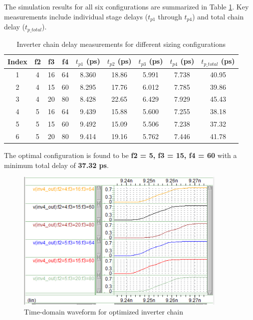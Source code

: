 \documentclass[UTF8,12pt,a4paper]{ctexart}
\begin{document}
The simulation results for all six configurations are summarized in Table \ref{tab:task2_results}. Key measurements include individual stage delays ($t_{p1}$ through $t_{p4}$) and total chain delay ($t_{p\_total}$).

\begin{table}[h]
\centering
\small
\begin{tabular}{|c|c|c|c|c|c|c|c|c|}
\hline
\textbf{Index} & \textbf{f2} & \textbf{f3} & \textbf{f4} & \textbf{$t_{p1}$ (ps)} & \textbf{$t_{p2}$ (ps)} & \textbf{$t_{p3}$ (ps)} & \textbf{$t_{p4}$ (ps)} & \textbf{$t_{p\_total}$ (ps)} \\
\hline
1 & 4 & 16 & 64 & 8.360 & 18.86 & 5.991 & 7.738 & 40.95 \\
2 & 4 & 15 & 60 & 8.295 & 17.76 & 6.012 & 7.785 & 39.86 \\
3 & 4 & 20 & 80 & 8.428 & 22.65 & 6.429 & 7.929 & 45.43 \\
4 & 5 & 16 & 64 & 9.439 & 15.88 & 5.600 & 7.255 & 38.18 \\
5 & 5 & 15 & 60 & 9.492 & 15.09 & 5.506 & 7.238 & 37.32 \\
6 & 5 & 20 & 80 & 9.414 & 19.16 & 5.762 & 7.446 & 41.78 \\
\hline
\end{tabular}
\caption{Inverter chain delay measurements for different sizing configurations}
\label{tab:task2_results}
\end{table}

The optimal configuration is found to be \textbf{f2 = 5, f3 = 15, f4 = 60} with a minimum total delay of \textbf{37.32 ps}.

\begin{figure}[h]
\centering
\includegraphics[width=0.9\textwidth]{任务书/image-2.png}
\caption{Time-domain waveform for optimized inverter chain}
\label{fig:task2_waveform}
\end{figure}
\end{document}
